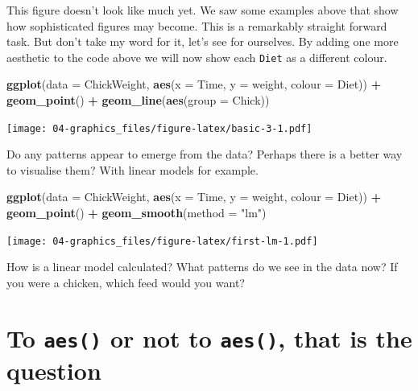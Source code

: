\documentclass[]{book}
\newenvironment{Shaded}{\begin{snugshade}}{\end{snugshade}}
\newcommand{\KeywordTok}[1]{\textcolor[rgb]{0.13,0.29,0.53}{\textbf{#1}}}
\newcommand{\DataTypeTok}[1]{\textcolor[rgb]{0.13,0.29,0.53}{#1}}
\newcommand{\StringTok}[1]{\textcolor[rgb]{0.31,0.60,0.02}{#1}}
\newcommand{\OperatorTok}[1]{\textcolor[rgb]{0.81,0.36,0.00}{\textbf{#1}}}
\newcommand{\NormalTok}[1]{#1}
\theoremstyle{definition}
\theoremstyle{definition}
\theoremstyle{definition}
\theoremstyle{remark}
\begin{document}
This figure doesn't look like much yet. We saw some examples above that
show how sophisticated figures may become. This is a remarkably straight
forward task. But don't take my word for it, let's see for ourselves. By
adding one more aesthetic to the code above we will now show each
\texttt{Diet} as a different colour.

\begin{Shaded}
\begin{Highlighting}[]
\KeywordTok{ggplot}\NormalTok{(}\DataTypeTok{data =}\NormalTok{ ChickWeight, }\KeywordTok{aes}\NormalTok{(}\DataTypeTok{x =}\NormalTok{ Time, }\DataTypeTok{y =}\NormalTok{ weight, }\DataTypeTok{colour =}\NormalTok{ Diet)) }\OperatorTok{+}
\StringTok{  }\KeywordTok{geom_point}\NormalTok{() }\OperatorTok{+}
\StringTok{  }\KeywordTok{geom_line}\NormalTok{(}\KeywordTok{aes}\NormalTok{(}\DataTypeTok{group =}\NormalTok{ Chick))}
\end{Highlighting}
\end{Shaded}

\texttt{[image: 04-graphics\_files/figure-latex/basic-3-1.pdf]}

Do any patterns appear to emerge from the data? Perhaps there is a
better way to visualise them? With linear models for example.

\begin{Shaded}
\begin{Highlighting}[]
\KeywordTok{ggplot}\NormalTok{(}\DataTypeTok{data =}\NormalTok{ ChickWeight, }\KeywordTok{aes}\NormalTok{(}\DataTypeTok{x =}\NormalTok{ Time, }\DataTypeTok{y =}\NormalTok{ weight, }\DataTypeTok{colour =}\NormalTok{ Diet)) }\OperatorTok{+}
\StringTok{  }\KeywordTok{geom_point}\NormalTok{() }\OperatorTok{+}
\StringTok{  }\KeywordTok{geom_smooth}\NormalTok{(}\DataTypeTok{method =} \StringTok{"lm"}\NormalTok{)}
\end{Highlighting}
\end{Shaded}

\texttt{[image: 04-graphics\_files/figure-latex/first-lm-1.pdf]}

How is a linear model calculated? What patterns do we see in the data
now? If you were a chicken, which feed would you want?

\section{\texorpdfstring{To \texttt{aes()} or not to \texttt{aes()},
that is the
question}{To aes() or not to aes(), that is the question}}\label{to-aes-or-not-to-aes-that-is-the-question}
\end{document}
